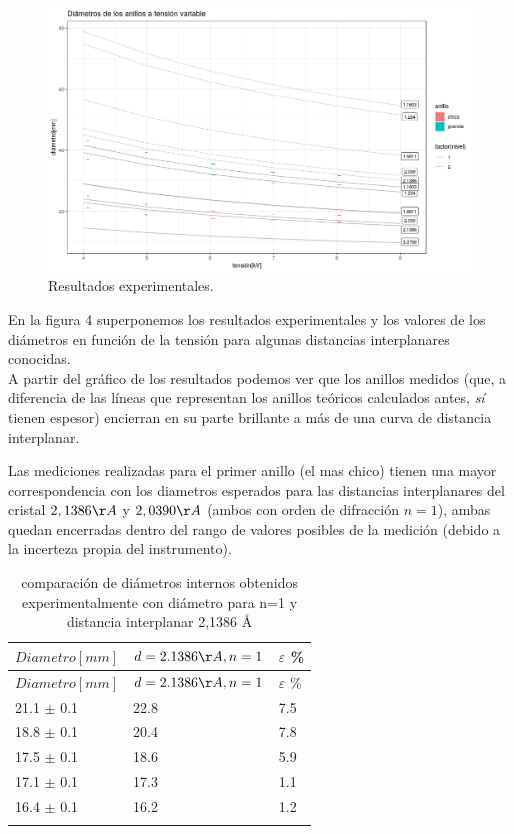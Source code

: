 \documentclass[]{article}
\begin{document}
\begin{figure}[H]
\centering
\includegraphics{resultados_experimentales.png}
\caption{Resultados experimentales.}
\end{figure}

En la figura 4 superponemos los resultados experimentales y los valores
de los diámetros en función de la tensión para algunas distancias
interplanares conocidas.\\
A partir del gráfico de los resultados podemos ver que los anillos
medidos (que, a diferencia de las líneas que representan los anillos
teóricos calculados antes, \emph{sí} tienen espesor) encierran en su
parte brillante a más de una curva de distancia interplanar.

Las mediciones realizadas para el primer anillo (el mas chico) tienen una mayor 
correspondencia con los diametros esperados para las distancias 
interplanares del cristal \(2,1386 \AA\) y \(2,0390 \AA\) (ambos con
orden de difracción $n=1$), ambas quedan encerradas dentro del rango de 
valores posibles de la medición (debido a la incerteza propia del instrumento).

\begin{longtable}[]{@{}lll@{}}
\toprule
\(Diametro[mm]\) & \(d=2.1386 \AA, n=1\) & \(\varepsilon\)
\%\tabularnewline
\midrule
\endfirsthead
\toprule
\(Diametro[mm]\) & \(d=2.1386 \AA, n=1\) & \(\varepsilon\)
\%\tabularnewline
\midrule
\endhead
21.1 \(\pm\) 0.1 & 22.8 & 7.5\tabularnewline
18.8 \(\pm\) 0.1 & 20.4 & 7.8\tabularnewline
17.5 \(\pm\) 0.1 & 18.6 & 5.9\tabularnewline
17.1 \(\pm\) 0.1 & 17.3 & 1.1\tabularnewline
16.4 \(\pm\) 0.1 & 16.2 & 1.2\tabularnewline
\bottomrule
\caption{comparación de diámetros internos obtenidos experimentalmente
con diámetro para n=1 y distancia interplanar 2,1386 Å}\tabularnewline
\end{longtable}
\end{document}
